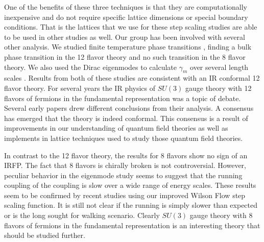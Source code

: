 One of the benefits of these three techniques is that they are computationally inexpensive and do not require specific lattice dimensions or special boundary conditions.
That is the lattices that we use for these step scaling studies are able to be used in other studies as well.
Our group has been involved with several other analysis.
We studied finite temperature phase transitions \cite{Schaich:2012fr}, finding a bulk phase transition in the 12 flavor theory and no such transition in the 8 flavor theory.
We also used the Dirac eigenmodes to calculate $\gamma_m$ over several length scales \cite{Cheng:2013bca,Cheng:2013eu}.
Results from both of these studies are consistent with an IR conformal 12 flavor theory.
For several years the IR physics of $SU(3)$ gauge theory with 12 flavors of fermions in the fundamental representation was a topic of debate.
Several early papers drew different conclusions from their analysis.
A consensus has emerged that the theory is indeed conformal.
This consensus is a result of improvements in our understanding of quantum field theories as well as implements in lattice techniques used to study those quantum field theories.

In contrast to the 12 flavor theory, the results for 8 flavors show no sign of an IRFP.
The fact that 8 flavors is chirally broken is not controversial.
However, peculiar behavior in the eigenmode study seems to suggest that the running coupling of the coupling is slow over a wide range of energy scales.
These results seem to be confirmed by recent studies using our improved Wilson Flow step scaling function.
It is still not clear if the running is simply slower than expected or is the long sought for walking scenario.
Clearly $SU(3)$ gauge theory with 8 flavors of fermions in the fundamental representation is an interesting theory that should be studied further.
